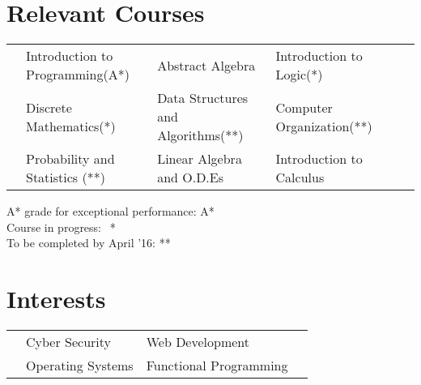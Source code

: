 \documentclass[11pt,a4paper]{article}
\begin{document}
\vspace{-0.4cm}
\section*{Relevant Courses}
\vspace{-0.2cm}
\begin{tabular}{L{0.05cm} L{5.8cm} L{6.5cm} L{7.5cm} L{8cm} L{13cm}}
& Introduction to Programming(A*)  & Abstract Algebra & Introduction to Logic(*)\\
& Discrete Mathematics(*)          & Data Structures and Algorithms(**) & Computer Organization(**)\\
& Probability and Statistics (**)   & Linear Algebra and O.D.Es          & Introduction to Calculus
\end{tabular}

\vspace{-0.3cm}
\begin{flushright}
  \footnotesize{A* grade for exceptional performance: A*}\\
  \footnotesize{Course in progress:$\ \ $ *}\\
  \footnotesize{To be completed by April '16: **}
\end{flushright}

\vspace{-1.5cm}
\section*{Interests}
\vspace{-0.3cm}
\begin{tabular}{L{0.05cm} L{7cm} L{6.5cm} L{7.5cm}}
& Cyber Security    & Web Development\\
& Operating Systems & Functional Programming
\end{tabular}
\end{document}
